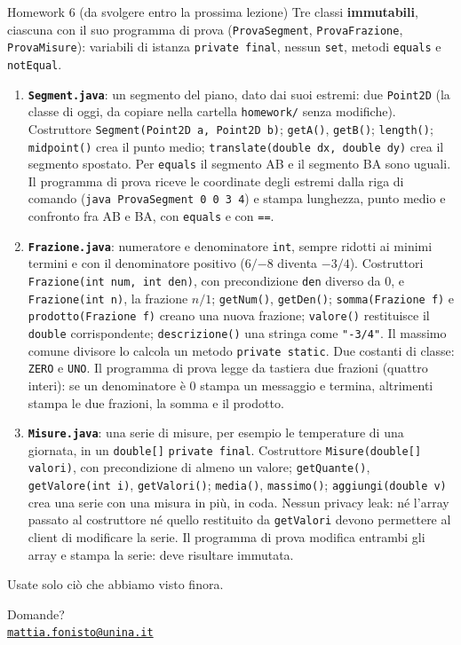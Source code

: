 \documentclass[10pt,aspectratio=169]{beamer}
\begin{document}
\begin{frame}{Homework 6 (da svolgere entro la prossima lezione)}
\footnotesize
Tre classi \textbf{immutabili}, ciascuna con il suo programma di prova (\texttt{ProvaSegment}, \texttt{ProvaFrazione}, \texttt{ProvaMisure}): variabili di istanza \texttt{private final}, nessun \texttt{set}, metodi \texttt{equals} e \texttt{notEqual}.
\begin{enumerate}\itemsep=3pt
    \item \textbf{\texttt{Segment.java}}: un segmento del piano, dato dai suoi estremi: due \texttt{Point2D} (la classe di oggi, da copiare nella cartella \texttt{homework/} senza modifiche). Costruttore \texttt{Segment(Point2D a, Point2D b)}; \texttt{getA()}, \texttt{getB()}; \texttt{length()}; \texttt{midpoint()} crea il punto medio; \texttt{translate(double dx, double dy)} crea il segmento spostato. Per \texttt{equals} il segmento AB e il segmento BA sono uguali. Il programma di prova riceve le coordinate degli estremi dalla riga di comando (\texttt{java ProvaSegment 0 0 3 4}) e stampa lunghezza, punto medio e confronto fra AB e BA, con \texttt{equals} e con \texttt{==}.
    \item \textbf{\texttt{Frazione.java}}: numeratore e denominatore \texttt{int}, sempre ridotti ai minimi termini e con il denominatore positivo ($6/{-8}$ diventa $-3/4$). Costruttori \texttt{Frazione(int num, int den)}, con precondizione \texttt{den} diverso da 0, e \texttt{Frazione(int n)}, la frazione $n/1$; \texttt{getNum()}, \texttt{getDen()}; \texttt{somma(Frazione f)} e \texttt{prodotto(Frazione f)} creano una nuova frazione; \texttt{valore()} restituisce il \texttt{double} corrispondente; \texttt{descrizione()} una stringa come \texttt{"-3/4"}. Il massimo comune divisore lo calcola un metodo \texttt{private static}. Due costanti di classe: \texttt{ZERO} e \texttt{UNO}. Il programma di prova legge da tastiera due frazioni (quattro interi): se un denominatore è 0 stampa un messaggio e termina, altrimenti stampa le due frazioni, la somma e il prodotto.
    \item \textbf{\texttt{Misure.java}}: una serie di misure, per esempio le temperature di una giornata, in un \texttt{double[]} \texttt{private final}. Costruttore \texttt{Misure(double[] valori)}, con precondizione di almeno un valore; \texttt{getQuante()}, \texttt{getValore(int i)}, \texttt{getValori()}; \texttt{media()}, \texttt{massimo()}; \texttt{aggiungi(double v)} crea una serie con una misura in più, in coda. Nessun privacy leak: né l'array passato al costruttore né quello restituito da \texttt{getValori} devono permettere al client di modificare la serie. Il programma di prova modifica entrambi gli array e stampa la serie: deve risultare immutata.
\end{enumerate}

Usate solo ciò che abbiamo visto finora.
\end{frame}

\begin{frame}
\begin{center}
{\Huge Domande?}\\[2.5em]
{\normalsize \href{mailto:mattia.fonisto@unina.it}{\texttt{mattia.fonisto@unina.it}}}
\end{center}
\end{frame}
\end{document}
